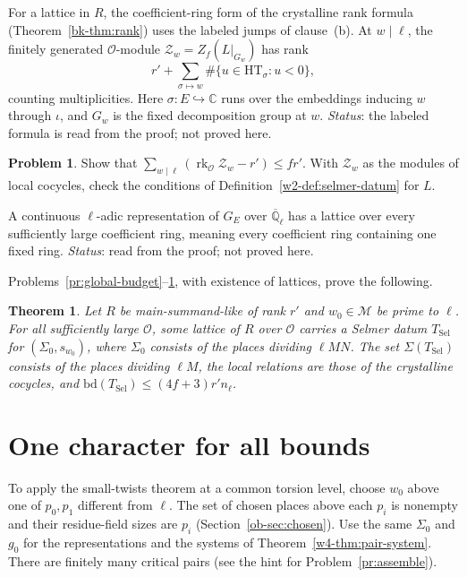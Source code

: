 \documentclass[reqno]{amsart}
\theoremstyle{definition}
\newtheorem{problem}{Problem}[section]
\theoremstyle{plain}
\newtheorem{theorem}{Theorem}[section]
\theoremstyle{remark}
\newcommand{\Q}{\mathbb Q}
\newcommand{\C}{\mathbb C}
\newcommand{\Oc}{\mathcal O}
\newcommand{\TS}{T_{\mathrm{Sel}}}
\newcommand{\bd}{\mathrm{bd}}
\newcommand{\rk}{\operatorname{rk}}
\begin{document}
For a lattice in \(R\), the coefficient-ring form of the crystalline rank formula (Theorem~\ref{bk-thm:rank}) uses the labeled jumps of clause~(b).  At \(w\mid\ell\), the finitely generated \(\Oc\)-module \(\mathcal Z_w=Z_f(L|_{G_w})\) has rank
\[
  r'+\sum_{\sigma\mapsto w}\#\{u\in\mathrm{HT}_\sigma:u<0\},
\]
counting multiplicities.  Here \(\sigma:E\hookrightarrow\C\) runs over the embeddings inducing \(w\) through \(\iota\), and \(G_w\) is the fixed decomposition group at \(w\).  \emph{Status}: the labeled formula is read from the proof; not proved here.

\begin{problem}\label{pr:rank}
Show that \(\sum_{w\mid\ell}(\rk_{\Oc}\mathcal Z_w-r')\le fr'\).  With \(\mathcal Z_w\) as the modules of local cocycles, check the conditions of Definition~\ref{w2-def:selmer-datum} for \(L\).
\end{problem}

A continuous \(\ell\)-adic representation of \(G_E\) over \(\overline{\Q}_\ell\) has a lattice over every sufficiently large coefficient ring, meaning every coefficient ring containing one fixed ring.  \emph{Status}: read from the proof; not proved here.

Problems~\ref{pr:global-budget}--\ref{pr:rank}, with existence of lattices, prove the following.

\begin{theorem}\label{thm:datum}
Let \(R\) be main-summand-like of rank \(r'\) and \(w_0\in\mathcal M\) be prime to \(\ell\).  For all sufficiently large \(\Oc\), some lattice of \(R\) over \(\Oc\) carries a Selmer datum \(\TS\) for \((\Sigma_0,s_{w_0})\), where \(\Sigma_0\) consists of the places dividing \(\ell MN\).  The set \(\Sigma(\TS)\) consists of the places dividing \(\ell M\), the local relations are those of the crystalline cocycles, and \(\bd(\TS)\le (4f+3)r'n_\ell\).
\end{theorem}

\section{One character for all bounds}\label{sec:twists}

To apply the small-twists theorem at a common torsion level, choose \(w_0\) above one of \(p_0,p_1\) different from \(\ell\).  The set of chosen places above each \(p_i\) is nonempty and their residue-field sizes are \(p_i\) (Section~\ref{ob-sec:chosen}).  Use the same \(\Sigma_0\) and \(g_0\) for the representations and the systems of Theorem~\ref{w4-thm:pair-system}.  There are finitely many critical pairs (see the hint for Problem~\ref{pr:assemble}).
\end{document}
